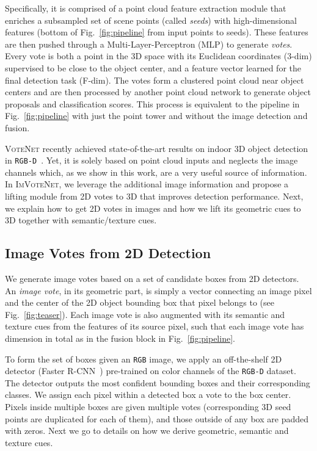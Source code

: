 \documentclass[10pt,twocolumn,letterpaper]{article}
\newcommand{\votenet}{\textsc{VoteNet}\xspace}
\newcommand{\imvotenet}{\textsc{ImVoteNet}\xspace}
\newcommand{\rgbd}{\texttt{RGB-D}\xspace}
\newcommand{\rgb}{\texttt{RGB}\xspace}
\begin{document}
Specifically, it is comprised of a point cloud feature extraction module that enriches a subsampled set of scene points (called \textit{seeds}) with high-dimensional features (bottom of Fig.~\ref{fig:pipeline} from  input points to  seeds). These features are then pushed through a Multi-Layer-Perceptron (MLP) to generate \emph{votes}. Every vote is both a point in the 3D space with its Euclidean coordinates (3-dim) supervised to be close to the object center, and a feature vector learned for the final detection task (F-dim). The votes form a clustered point cloud near object centers and are then processed by another point cloud network to generate object proposals and classification scores. This process is equivalent to the pipeline in Fig.~\ref{fig:pipeline} with just the point tower and without the image detection and fusion.

\votenet recently achieved state-of-the-art results on indoor 3D object detection in \rgbd~\cite{voteNet}. Yet, it is solely based on point cloud inputs and neglects the image channels which, as we show in this work, are a very useful source of information. In \imvotenet, we leverage the additional image information and propose a lifting module from 2D votes to 3D that improves detection performance. Next, we explain how to get 2D votes in images and how we lift its geometric cues to 3D together with semantic/texture cues.

\subsection{Image Votes from 2D Detection}
\label{sec:image_vote_method}
We generate image votes based on a set of candidate boxes from 2D detectors. An \emph{image vote}, in its geometric part, is simply a vector connecting an image pixel and the center of the 2D object bounding box that pixel belongs to (see Fig.~\ref{fig:teaser}). Each image vote is also augmented with its semantic and texture cues from the features of its source pixel, such that each image vote has  dimension in total as in the fusion block in Fig.~\ref{fig:pipeline}.

To form the set of boxes given an \rgb image, we apply an off-the-shelf 2D detector (\eg Faster R-CNN~\cite{ren2015faster}) pre-trained on color channels of the \rgbd dataset. The detector outputs the  most confident bounding boxes and their corresponding classes.
We assign each pixel within a detected box a vote to the box center. Pixels inside multiple boxes are given multiple votes (corresponding 3D seed points are duplicated for each of them), and those outside of any box are padded with zeros. Next we go to details on how we derive geometric, semantic and texture cues.
\end{document}
